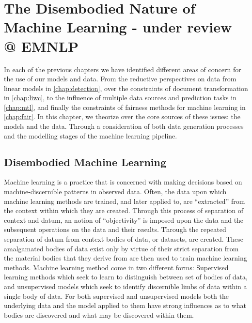 \ifpdf
    \graphicspath{{Chapter8/Figs/Raster/}{Chapter8/Figs/PDF/}{Chapter8/Figs/}}
\else
    \graphicspath{{Chapter8/Figs/Vector/}{Chapter8/Figs/}}
\fi


\chapter{The Disembodied Nature of Machine Learning - under review @ EMNLP}\label{chap:disembodied}

In each of the previous chapters we have identified different areas of concern for the use of our models and data. From the reductive perspectives on data from linear models in \autoref{chap:detection}, over the constraints of document transformation in \autoref{chap:liwc}, to the influence of multiple data sources and prediction tasks in \autoref{chap:mtl}, and finally the constraints of fairness methods for machine learning in \autoref{chap:fair}. In this chapter, we theorize over the core sources of these issues: the models and the data. Through a consideration of both data generation processes and the modelling stages of the machine learning pipeline.

\section{Disembodied Machine Learning}

Machine learning is a practice that is concerned with making decisions based on machine-discernible patterns in observed data. Often, the data upon which machine learning methods are trained, and later applied to, are ``extracted'' from the context within which they are created. Through this process of separation of context and datum, an notion of ``objectivity'' is imposed upon the data and the subsequent operations on the data and their results. Through the repeated separation of datum from context bodies of data, or datasets, are created. These amalgamated bodies of data exist only by virtue of their strict separation from the material bodies that they derive from are then used to train machine learning methods. Machine learning method come in two different forms: Supervised learning methods which seek to learn to distinguish between set of bodies of data, and unsupervised models which seek to identify discernible limbs of data within a single body of data. For both supervised and unsupervised models both the underlying data and the model applied to them have strong influences as to what bodies are discovered and what may be discovered within them.

